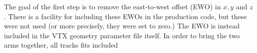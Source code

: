 \documentclass[12pt]{article}
\begin{document}

The goal of the first step is to remove the east-to-west offset (EWO) in $x, y$ and $z$. There is a facility for including these EWOs in the production code, but these were not used (or more precisely, they were set to zero.) The EWO is instead included in the VTX geometry parameter file itself. In order to bring the two arms together, all tracks fits included 
\end{document}
